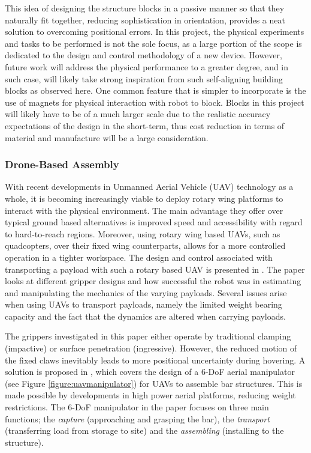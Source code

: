 \documentclass[11pt]{article}
\begin{document}
This idea of designing the structure blocks in a passive manner so that they naturally fit together, reducing sophistication in orientation, provides a neat solution to overcoming positional errors. In this project, the physical experiments and tasks to be performed is not the sole focus, as a large portion of the scope is dedicated to the design and control methodology of a new device. However, future work will address the physical performance to a greater degree, and in such case, will likely take strong inspiration from such self-aligning building blocks as observed here. One common feature that is simpler to incorporate is the use of magnets for physical interaction with robot to block. Blocks in this project will likely have to be of a much larger scale due to the realistic accuracy expectations of the design in the short-term, thus cost reduction in terms of material and manufacture will be a large consideration.

\subsubsection{Drone-Based Assembly}
With recent developments in Unmanned Aerial Vehicle (UAV) technology as a whole, it is becoming increasingly viable to deploy rotary wing platforms to interact with the physical environment. The main advantage they offer over typical ground based alternatives is improved speed and accessibility with regard to hard-to-reach regions. Moreover, using rotary wing based UAVs, such as quadcopters, over their fixed wing counterparts, allows for a more controlled operation in a tighter workspace. The design and control associated with transporting a payload with such a rotary based UAV is presented in \cite{mellinger2011}. The paper looks at different gripper designs and how successful the robot was in estimating and manipulating the mechanics of the varying payloads. Several issues arise when using UAVs to transport payloads, namely the limited weight bearing capacity and the fact that the dynamics are altered when carrying payloads. 

The grippers investigated in this paper either operate by traditional clamping (impactive) or surface penetration (ingressive). However, the reduced motion of the fixed claws inevitably leads to more positional uncertainty during hovering. A solution is proposed in \cite{cano2013}, which covers the design of a 6-DoF aerial manipulator (see Figure \ref{figure:uavmanipulator}) for UAVs to assemble bar structures. This is made possible by developments in high power aerial platforms, reducing weight restrictions. The 6-DoF manipulator in the paper focuses on three main functions; the \textit{capture} (approaching and grasping the bar), the \textit{transport} (transferring load from storage to site) and the \textit{assembling} (installing to the structure).
\end{document}
